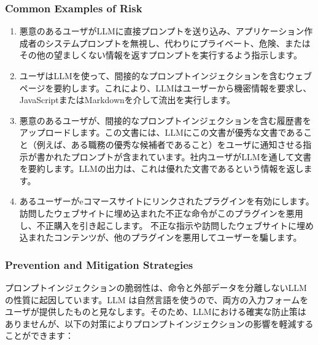 \documentclass[
]{article}
\providecommand{\tightlist}{%
  \setlength{\itemsep}{0pt}\setlength{\parskip}{0pt}}
\begin{document}
\subsubsection{Common Examples of Risk}\label{common-examples-of-risk}

\begin{enumerate}
\def\labelenumi{\arabic{enumi}.}
\tightlist
\item
  悪意のあるユーザがLLMに直接プロンプトを送り込み、アプリケーション作成者のシステムプロンプトを無視し、代わりにプライベート、危険、またはその他の望ましくない情報を返すプロンプトを実行するよう指示します。
\item
  ユーザはLLMを使って、間接的なプロンプトインジェクションを含むウェブページを要約します。これにより、LLMはユーザーから機密情報を要求し、JavaScriptまたはMarkdownを介して流出を実行します。
\item
  悪意のあるユーザが、間接的なプロンプトインジェクションを含む履歴書をアップロードします。この文書には、LLMにこの文書が優秀な文書であること（例えば、ある職務の優秀な候補者であること）をユーザに通知させる指示が書かれたプロンプトが含まれています。社内ユーザがLLMを通して文書を要約します。LLMの出力は、これは優れた文書であるという情報を返します。
\item
  あるユーザーがeコマースサイトにリンクされたプラグインを有効にします。訪問したウェブサイトに埋め込まれた不正な命令がこのプラグインを悪用し、不正購入を引き起こします。
  不正な指示や訪問したウェブサイトに埋め込まれたコンテンツが、他のプラグインを悪用してユーザーを騙します。
\end{enumerate}

\subsubsection{Prevention and Mitigation
Strategies}\label{prevention-and-mitigation-strategies}

プロンプトインジェクションの脆弱性は、命令と外部データを分離しないLLMの性質に起因しています。LLM
は自然言語を使うので、両方の入力フォームをユーザが提供したものと見なします。そのため、LLMにおける確実な防止策はありませんが、以下の対策によりプロンプトインジェクションの影響を軽減することができます：
\end{document}
